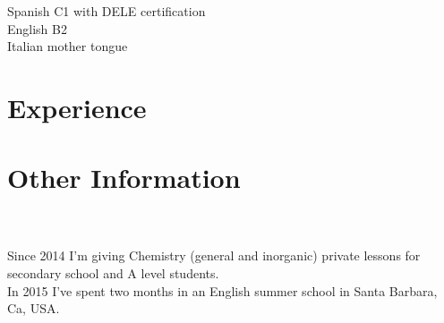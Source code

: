 \documentclass[]{twentysecondcv}
\begin{document}
Spanish C1 with DELE certification \\
English B2 \\
Italian mother tongue \\







								 \section{Experience}

								\begin{twenty}
								

\end{twenty}
																								\section{Other Information} \\ \\					
								Since 2014 I'm giving Chemistry (general and inorganic) private lessons for secondary school and A level students. \\
							
In 2015 I've spent two months in an English summer school in Santa Barbara, Ca, USA.
																
\end{document}
